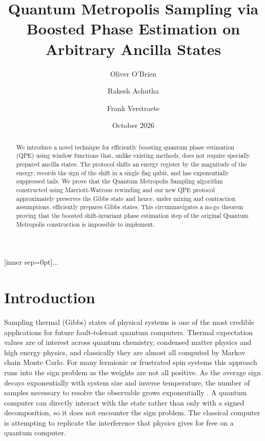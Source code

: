 \documentclass[aps,floatfix,10pt,amssymb,amsfont,amsmath,superscriptaddress,float,nofootinbib,longbibliography,nobalancelastpage,twocolumn]{revtex4-2}
\date{October 2026}
\begin{document}
[inner sep=0pt]{$\dots$}

\title{Quantum Metropolis Sampling via Boosted Phase Estimation on Arbitrary Ancilla States}
\author{Oliver O'Brien}
\author{Rakesh Achutha}
\author{Frank Verstraete}

\begin{abstract}
    We introduce a novel technique for efficiently boosting quantum phase estimation (QPE) using window functions that, unlike existing methods, does not require specially prepared ancilla states. The protocol shifts an energy register by the magnitude of the energy, records the sign of the shift in a single flag qubit, and has exponentially suppressed tails. We prove that the Quantum Metropolis Sampling algorithm constructed using Marriott-Watrous rewinding and our new QPE protocol approximately preserves the Gibbs state and hence, under mixing and contraction assumptions, efficiently prepares Gibbs states. This circumnavigates a no-go theorem proving that the boosted shift-invariant phase estimation step of the original Quantum Metropolis construction is impossible to implement.
\end{abstract}

\maketitle

\section{Introduction}
Sampling thermal (Gibbs) states of physical systems is one of the most credible applications for future fault-tolerant quantum computers. Thermal expectation values are of interest across quantum chemistry, condensed matter physics and high energy physics, and classically they are almost all computed by Markov chain Monte Carlo. For many fermionic or frustrated spin systems this approach runs into the sign problem as the weights are not all positive. As the average sign decays exponentially with system size and inverse temperature, the number of samples necessary to resolve the observable grows exponentially \cite{Troyer_2005}. A quantum computer can directly interact with the state rather than only with a signed decomposition, so it does not encounter the sign problem. The classical computer is attempting to replicate the interference that physics gives for free on a quantum computer.
\end{document}
